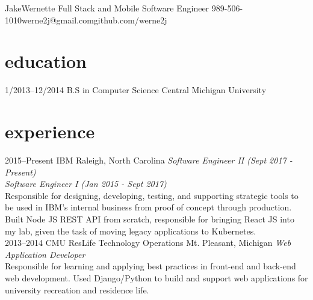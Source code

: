 \documentclass[]{friggeri-cv} %
\begin{document}
\header
{Jake}{Wernette}
{Full Stack and Mobile Software Engineer}
{989-506-1010\space\space\space\space\space\space werne2j@gmail.com\space\space\space\space\space\space github.com/werne2j}




\section{education}

\begin{entrylist}

\entry
{1/2013--12/2014}
{B.S in Computer Science{\normalfont}}
{Central Michigan University}

\end{entrylist}


\section{experience}

\begin{entrylist}
\entry
{2015--Present}
{IBM}
{Raleigh, North Carolina}
{\emph{Software Engineer II (Sept 2017 - Present)} \\
\emph{Software Engineer I (Jan 2015 - Sept 2017)} \\
Responsible for designing, developing, testing, and supporting strategic tools to be used in IBM's internal business from proof of concept through production.
Built Node JS REST API from scratch, responsible for bringing React JS into my lab, given the task of moving legacy applications to Kubernetes. }\\

\entry
{2013--2014}
{CMU ResLife Technology Operations}
{Mt. Pleasant, Michigan}
{\emph{Web Application Developer} \\
Responsible for learning and applying best practices in front-end and back-end web development. Used Django/Python to build and support web applications for university recreation and residence life.}\\

\end{entrylist}
\end{document}
